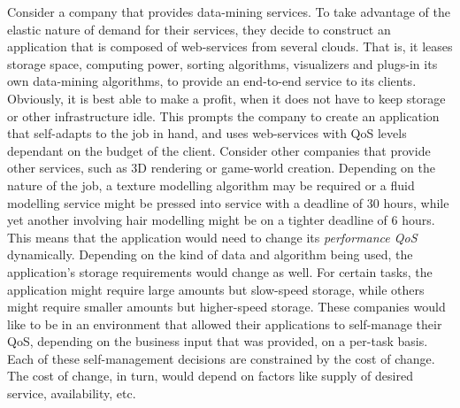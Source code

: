 \documentclass[10pt,journal,compsoc]{IEEEtran}
\begin{document}
Consider a company that provides data-mining services. To take advantage of the elastic nature of demand for their services, they decide to construct an application that is composed of web-services from several clouds. That is, it leases storage space, computing power, sorting algorithms, visualizers and plugs-in its own data-mining algorithms, to provide an end-to-end service to its clients. Obviously, it is best able to make a profit, when it does not have to keep storage or other infrastructure idle. This prompts the company to create an application that self-adapts to the job in hand, and uses web-services with QoS levels dependant on the budget of the client. Consider other companies that provide other services, such as 3D rendering or game-world creation. Depending on the nature of the job, a texture modelling algorithm may be required or a fluid modelling service might be pressed into service with a deadline of 30 hours, while yet another involving hair modelling might be on a tighter deadline of 6 hours. This means that the application would need to change its \textit{performance QoS} dynamically. Depending on the kind of data and algorithm being used, the application's storage requirements would change as well. For certain tasks, the application might require large amounts but slow-speed storage, while others might require smaller amounts but higher-speed storage. These companies would like to be in an environment that allowed their applications to self-manage their QoS, depending on the business input that was provided, on a per-task basis. Each of these self-management decisions are constrained by the cost of change. The cost of change, in turn, would depend on factors like supply of desired service, availability, etc. 
\end{document}
